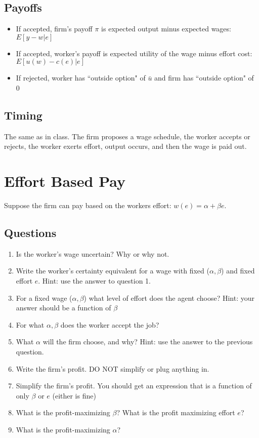 \documentclass{article}
\begin{document}
\subsection{Payoffs}
    \begin{itemize}
    \item If accepted, firm's payoff $\pi$ is expected output minus expected wages: $E[y-w|e]$
    \item If accepted, worker's payoff is expected utility of the wage minus effort cost: $E[u(w) -c(e)|e]$
    \item If rejected, worker has ``outside option" of $\bar u$ and firm has ``outside option" of 0
\end{itemize}

\subsection{Timing}
 The same as in class. The firm proposes a wage schedule, the worker accepts or rejects, the worker exerts effort, output occurs, and then the wage is paid out.


\section{Effort Based Pay}

Suppose the firm can pay based on the workers effort:  $w(e)=\alpha + \beta e$.

\subsection{Questions}
\begin{enumerate}
    \item Is the worker's wage uncertain? Why or why not.
    \item Write the worker's certainty equivalent for a wage with fixed ($\alpha, \beta$) and fixed effort $e$. Hint: use the answer to question 1.
    \item For a fixed wage ($\alpha, \beta$) what level of effort does the agent choose? Hint: your answer should be a function of $\beta$
    \item For what $\alpha, \beta$ does the worker accept the job?
    \item What $\alpha$ will the firm choose, and why? Hint: use the answer to the previous question.
    \item Write the firm's profit. DO NOT simplify or plug anything in.
    \item Simplify the firm's profit. You should get an expression that is a function of only $\beta$ or $e$ (either is fine)
    \item What is the profit-maximizing $\beta$? What is the profit maximizing effort $e$?
    \item What is the profit-maximizing $\alpha$?
\end{enumerate}
\end{document}
